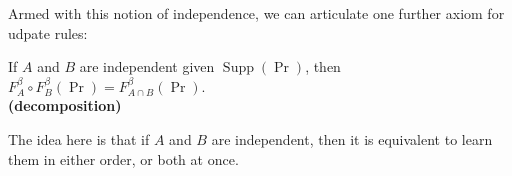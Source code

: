 \documentclass{article}
\DeclareMathOperator{\supp}{\mathrm{Supp}}
\begin{document}
\begin{wip}
\begin{enumerate}
\end{enumerate}

Armed with this notion of independence, we can articulate one further axiom for udpate rules:
\begin{URaxioms}
    \item
    If $A$ and $B$ are independent given $\supp(\Pr)$, then
    $F^{\beta}_A \circ F^{\beta}_B (\Pr) = F^{\beta}_{A \cap B}(\Pr)$. \\
        \hfill \textbf{(decomposition)}
\end{URaxioms}
The idea here is that if $A$ and $B$ are independent, then it is equivalent to learn them in either order, or both at once.




\end{wip}
\end{document}
